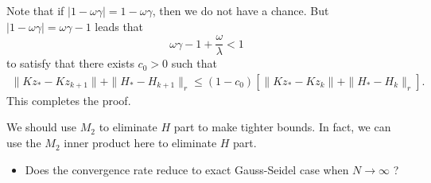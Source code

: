 Note that if $|1 - \omega\gamma| = 1 - \omega\gamma$, then we do not have a chance. But $|1 - \omega\gamma| = \omega\gamma - 1$ leads that 
\begin{equation}
\omega \gamma - 1 + \frac{\omega}{\lambda} < 1 
\end{equation}
to satisfy that there exists $c_0 > 0$ such that
\begin{eqnarray*}
\|Kz_* - Kz_{k+1}\| + \|H_* - H_{k+1}\|_r \leq (1 - c_0) \left [ \|Kz_* - Kz_k\| + \|H_* - H_k\|_r \right ]. 
\end{eqnarray*}
This completes the proof. 
\begin{remark}
We should use $M_2$ to eliminate $H$ part to make tighter bounds. In fact, we can use the $M_2$ inner product here to eliminate $H$ part.  
\end{remark}

\begin{itemize}
\item Does the convergence rate reduce to exact Gauss-Seidel case when $N\rightarrow \infty$ ? 
\end{itemize}





%
